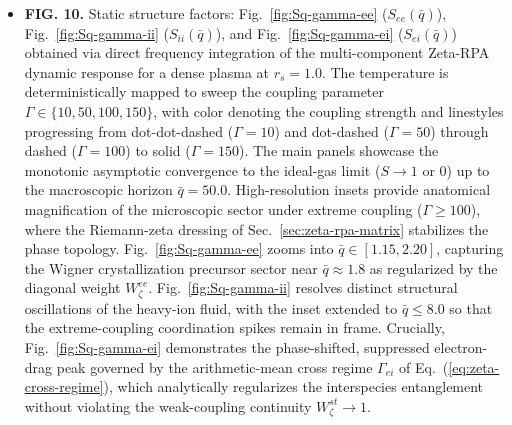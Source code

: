 \documentclass[aps,showkeys,noshowpacs,superscriptaddress,pre,preprint]{revtex4-2}
\begin{document}
\begin{itemize}
    \item \textbf{FIG. 10.} Static structure factors: Fig.~\ref{fig:Sq-gamma-ee} ($S_{ee}(\bar{q})$), Fig.~\ref{fig:Sq-gamma-ii} ($S_{ii}(\bar{q})$), and Fig.~\ref{fig:Sq-gamma-ei} ($S_{ei}(\bar{q})$) obtained via direct frequency integration of the multi-component Zeta-RPA dynamic response for a dense plasma at $r_s = 1.0$.
    The temperature is deterministically mapped to sweep the coupling parameter $\Gamma \in \{10, 50, 100, 150\}$, with color denoting the coupling strength and linestyles progressing from dot-dot-dashed ($\Gamma = 10$) and dot-dashed ($\Gamma = 50$) through dashed ($\Gamma = 100$) to solid ($\Gamma = 150$).
    The main panels showcase the monotonic asymptotic convergence to the ideal-gas limit ($S \to 1$ or $0$) up to the macroscopic horizon $\bar{q} = 50.0$.
    High-resolution insets provide anatomical magnification of the microscopic sector under extreme coupling ($\Gamma \ge 100$), where the Riemann-zeta dressing of Sec.~\ref{sec:zeta-rpa-matrix} stabilizes the phase topology.
    Fig.~\ref{fig:Sq-gamma-ee} zooms into $\bar{q} \in [1.15, 2.20]$, capturing the Wigner crystallization precursor sector near $\bar{q} \approx 1.8$ as regularized by the diagonal weight $W_\zeta^{ee}$.
    Fig.~\ref{fig:Sq-gamma-ii} resolves distinct structural oscillations of the heavy-ion fluid, with the inset extended to $\bar{q} \le 8.0$ so that the extreme-coupling coordination spikes remain in frame.
    Crucially, Fig.~\ref{fig:Sq-gamma-ei} demonstrates the phase-shifted, suppressed electron-drag peak governed by the arithmetic-mean cross regime $\Gamma_{ei}$ of Eq.~(\ref{eq:zeta-cross-regime}), which analytically regularizes the interspecies entanglement without violating the weak-coupling continuity $W_\zeta^{st}\to 1$.
\end{itemize}
\end{document}
